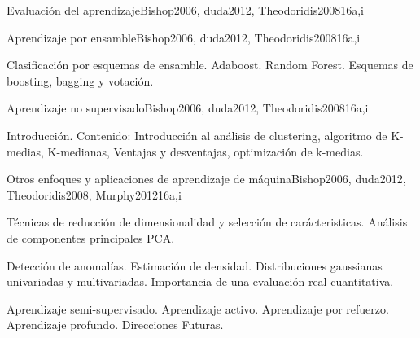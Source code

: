 \begin{syllabus}
\begin{unit}{Evaluación del aprendizaje}{}{Bishop2006, duda2012, Theodoridis2008}{16}{a,i}
\end{unit}

\begin{unit}{Aprendizaje por ensamble}{}{Bishop2006, duda2012, Theodoridis2008}{16}{a,i}
\begin{topics}
      \item Clasificación por esquemas de ensamble. Adaboost. Random Forest. Esquemas de boosting, bagging y votación.
   \end{topics}

\end{unit}

\begin{unit}{Aprendizaje no supervisado}{}{Bishop2006, duda2012, Theodoridis2008}{16}{a,i}
\begin{topics}
      \item Introducción. Contenido: Introducción al análisis de clustering, algoritmo de K-medias, K-medianas, Ventajas y desventajas, optimización de k-medias.
   \end{topics}

\end{unit}

\begin{unit}{Otros enfoques y aplicaciones de aprendizaje de máquina}{}{Bishop2006, duda2012, Theodoridis2008, Murphy2012}{16}{a,i}
\begin{topics}
      \item Técnicas de reducción de dimensionalidad y selección de carácteristicas. Análisis de componentes principales PCA.
      \item Detección de anomalías. Estimación de densidad. Distribuciones gaussianas univariadas y multivariadas. Importancia de una evaluación real cuantitativa.
      \item Aprendizaje semi-supervisado. Aprendizaje activo. Aprendizaje por refuerzo. Aprendizaje profundo. Direcciones Futuras.
   \end{topics}
\end{unit}



\begin{coursebibliography}
\end{coursebibliography}

\end{syllabus}
